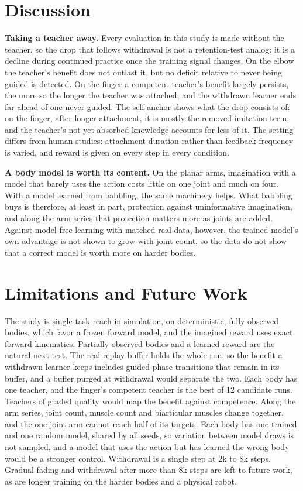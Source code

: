 \documentclass[journal]{IEEEtran}
\begin{document}
\section{Discussion}

\textbf{Taking a teacher away.} Every evaluation in this study is made without
the teacher, so the drop that follows withdrawal is not a retention-test
analog: it is a decline during continued practice once the training signal
changes. On the elbow the teacher's benefit does not outlast it, but no deficit
relative to never being guided is detected. On the finger a competent
teacher's benefit largely persists, the more so the longer the teacher was
attached, and the withdrawn learner ends far ahead of one never guided. The
self-anchor shows what the drop consists of: on the finger, after longer
attachment, it is mostly the removed imitation term, and the teacher's
not-yet-absorbed knowledge accounts for less of it.
The setting differs from human studies: attachment duration rather than
feedback frequency is varied, and reward is given on every step in every
condition.

\textbf{A body model is worth its content.} On the planar arms, imagination
with a model that barely uses the action costs little on one joint and much on
four. With a model learned from babbling, the same machinery helps. What
babbling buys is therefore, at least in part, protection against uninformative
imagination, and along the arm series that protection matters more as joints
are added. Against model-free learning with matched real data, however, the
trained model's own advantage is not shown to grow with joint count, so the
data do not show that a correct model is worth more on harder bodies.

\section{Limitations and Future Work}
\label{sec:limits}
The study is single-task reach in simulation, on deterministic, fully
observed bodies, which favor a frozen forward model, and the imagined reward
uses exact forward kinematics. Partially observed bodies and a learned reward
are the natural next test. The real replay buffer holds the whole run, so the
benefit a withdrawn learner keeps includes guided-phase transitions that remain
in its buffer, and a buffer purged at withdrawal would separate the two. Each body
has one teacher, and the finger's competent teacher is the best of 12
candidate runs. Teachers of graded quality would map the benefit against
competence. Along the arm series, joint count, muscle count and biarticular
muscles change together, and the one-joint arm cannot reach half of its
targets. Each body has one trained and one random model, shared by all
seeds, so variation between model draws is not sampled, and a model that uses
the action but has learned the wrong body would be a stronger control.
Withdrawal is a single step at 2k to 8k steps. Gradual fading and withdrawal
after more than 8k steps are left to future work, as are longer training on the
harder bodies and a physical robot.
\end{document}
